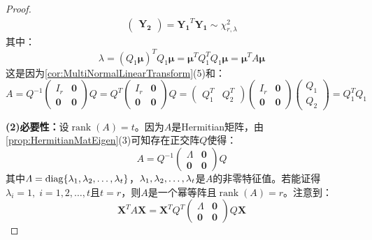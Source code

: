 \begin{proof}
\begin{align*}
\begin{pmatrix}
			\mathbf{Y_2}
		\end{pmatrix}
		=\mathbf{Y_1}^T\mathbf{Y_1}\sim\chi_{r,\lambda}^2
	\end{align*}
	其中：
	\begin{equation*}
		\lambda=(Q_1\boldsymbol{\mu})^TQ_1\boldsymbol{\mu}=\boldsymbol{\mu}^TQ_1^TQ_1\boldsymbol{\mu}=\boldsymbol{\mu}^TA\boldsymbol{\mu}
	\end{equation*}
	这是因为\cref{cor:MultiNormalLinearTransform}(5)和：
	\begin{equation*}
		A=Q^{-1}
		\begin{pmatrix}
			I_r & \mathbf{0} \\
			\mathbf{0} & \mathbf{0}
		\end{pmatrix}Q
		=Q^T
		\begin{pmatrix}
			I_r & \mathbf{0} \\
			\mathbf{0} & \mathbf{0}
		\end{pmatrix}Q
		=
		\begin{pmatrix}
			Q_1^T & Q_2^T
		\end{pmatrix}
			\begin{pmatrix}
			I_r & \mathbf{0} \\
			\mathbf{0} & \mathbf{0}
		\end{pmatrix}
		\begin{pmatrix}
			Q_1 \\
			Q_2
		\end{pmatrix}
		=Q_1^TQ_1
	\end{equation*}\par
	\textbf{(2)必要性：}设$\operatorname{rank}(A)=t$。因为$A$是Hermitian矩阵，由\cref{prop:HermitianMatEigen}(3)可知存在正交阵$Q$使得：
	\begin{equation*}
		A=Q^{-1}
		\begin{pmatrix}
			\varLambda & \mathbf{0} \\
			\mathbf{0} & \mathbf{0}
		\end{pmatrix}
		Q
	\end{equation*}
	其中$\varLambda=\operatorname{diag}\{\lambda_1, \lambda_2, \dots, \lambda_{t}\}$，$\lambda_1, \lambda_2, \dots, \lambda_{t}$是$A$的非零特征值。若能证得$\lambda_i=1,\;i=1,2,\dots,t$且$t=r$，则$A$是一个幂等阵且$\operatorname{rank}(A)=r$。注意到：
	\begin{equation*}
		\mathbf{X}^TA\mathbf{X}=\mathbf{X}^TQ^T
		\begin{pmatrix}
			\varLambda & \mathbf{0} \\
			\mathbf{0} & \mathbf{0}
		\end{pmatrix}
		Q\mathbf{X}
	\end{equation*}

\end{proof}
